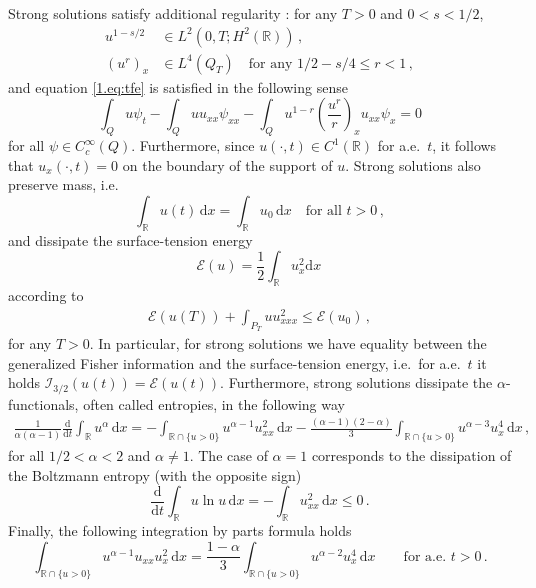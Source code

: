 \documentclass[12pt]{amsart}
\newcommand{\R}{{\mathbb R}}
\newcommand{\dd}{{\mathrm{d}}}
\newcommand{\E}{\mathcal{E}}
\newcommand{\I}{\mathcal{I}}
\theoremstyle{plain}
\theoremstyle{definition}
\theoremstyle{remark}
\begin{document}
Strong solutions satisfy additional regularity \cite{Ber96, CaTo02}: for any $T>0$ and $0 < s <1/2$, 
\begin{align*}
    u^{1-s/2} &\in L^2(0,T;H^2(\R))\,,\\
    (u^r)_x & \in L^4(Q_T) \quad\text{for any }1/2 - s/4 \leq r <1\,,
\end{align*}
and equation \eqref{1.eq:tfe} is satisfied in the following sense
\begin{equation*}
\int_Q u\psi_t - \int_Q uu_{xx}\psi_{xx} - \int_Q u^{1-r}\left(\frac{u^r}{r}\right)_xu_{xx}\psi_x = 0
\end{equation*}
for all $\psi\in C_c^\infty(Q)$. Furthermore, since $u(\cdot,t)\in C^1(\R)$ for a.e.~$t$, it follows that $u_x(\cdot,t)=0$ on the boundary of the support of $u$.
Strong solutions also preserve mass, i.e.
\begin{equation*}
    \int_\R u(t)\,\dd x = \int_\R u_0\,\dd x \quad \text{for all $t>0$}\,,
\end{equation*}
and dissipate the surface-tension energy 
$$\E(u) = \frac12\int_{\R}u_x^2\dd x\,$$ according to
\begin{align*}
    \E(u(T))+\int_{P_T} u u_{xxx}^2 \leq \E(u_0)\,,
\end{align*}
for any $T>0$. In particular, for strong solutions we have equality between the generalized Fisher information and the surface-tension energy, i.e.~for a.e.~$t$ it holds $\I_{3/2}(u(t)) = \E(u(t))$. 
Furthermore, strong solutions dissipate the $\alpha$-functionals, often called entropies, in the following way
\begin{align*}
    \frac{1}{\alpha(\alpha-1)}\frac{\dd}{\dd t}\int_{\R}u^\alpha\, \dd x = - \int_{\R\cap\{u>0\}}u^{\alpha-1}u_{xx}^2\,\dd x - \frac{(\alpha-1)(2-\alpha)}{3}\int_{\R\cap\{u>0\}}u^{\alpha-3}u_{x}^4\,\dd x\,,
\end{align*}
for all $1/2 < \alpha < 2$ and $\alpha\neq 1$. The case of $\alpha=1$ corresponds to the dissipation of the Boltzmann entropy (with the opposite sign)
\begin{equation*}
    \frac{\dd}{\dd t}\int_\R u \ln u\, \dd x = -\int_\R u_{xx}^2\, \dd x \leq 0\,.
\end{equation*}
Finally, the following integration by parts formula holds
\begin{equation}\label{3.eq:intbyparts}
    \int_{\R\cap\{u>0\}}u^{\alpha-1}u_{xx}u_x^2\, \dd x = \frac{1-\alpha}{3} \int_{\R\cap\{u>0\}}u^{\alpha-2}u_x^4\, \dd x\qquad \text{for a.e. }t>0\,.
\end{equation}
\end{document}
